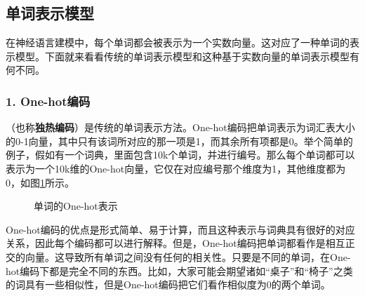 
\subsection{单词表示模型}

\parinterval  在神经语言建模中，每个单词都会被表示为一个实数向量。这对应了一种单词的表示模型。下面就来看看传统的单词表示模型和这种基于实数向量的单词表示模型有何不同。


\subsubsection{1. One-hot编码}

（也称{\small\sffamily\bfseries{独热编码}}）是传统的单词表示方法。One-hot编码把单词表示为词汇表大小的0-1向量，其中只有该词所对应的那一项是1，而其余所有项都是0。举个简单的例子，假如有一个词典，里面包含10k个单词，并进行编号。那么每个单词都可以表示为一个10k维的One-hot向量，它仅在对应编号那个维度为1，其他维度都为0，如图\ref{fig:9-64}所示。

\begin{figure}[htp]
\centering

\caption{单词的One-hot表示 }
\label{fig:9-64}
\end{figure}

\parinterval  One-hot编码的优点是形式简单、易于计算，而且这种表示与词典具有很好的对应关系，因此每个编码都可以进行解释。但是，One-hot编码把单词都看作是相互正交的向量。这导致所有单词之间没有任何的相关性。只要是不同的单词，在One-hot编码下都是完全不同的东西。比如，大家可能会期望诸如“桌子”和“椅子”之类的词具有一些相似性，但是One-hot编码把它们看作相似度为0的两个单词。


